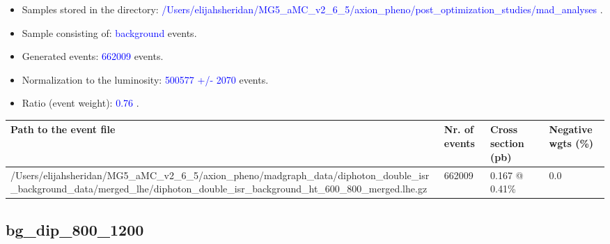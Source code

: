 \documentclass[a4paper, 10pt]{article}
\begin{document}
\begin{itemize}
  \item Samples stored in the directory: \textcolor{blue}{/\-Users/\-elijahsheridan/\-MG5\_aMC\_v2\_6\_5/\-axion\_pheno/\-post\_optimization\_studies/\-mad\_analyses} .
   \item Sample consisting of: \textcolor{blue}{background}  events.
   \item Generated events: \textcolor{blue}{662009 }  events.
   \item Normalization to the luminosity: \textcolor{blue}{500577}\textcolor{blue}{ +/\-- }\textcolor{blue}{2070 }  events.
   \item Ratio (event weight): \textcolor{blue}{0.76 } .  
 
\end{itemize}
\begin{table}[H]
  \begin{center}
    \begin{tabular}{|m{55.0mm}|m{25.0mm}|m{30.0mm}|m{30.0mm}|}
      \hline
      {\cellcolor{yellow}         Path to the event file}& {\cellcolor{yellow}         Nr. of events}& {\cellcolor{yellow}         Cross section (pb)}& {\cellcolor{yellow}         Negative wgts (\%)}\\
      \hline
      {\cellcolor{white}          /\-Users/\-elijahsheridan/\-MG5\_aMC\_v2\_6\_5/\-axion\_pheno/\-madgraph\_data/\-diphoton\_double\_isr\_background\_data/\-merged\_lhe/\-diphoton\_double\_isr\_background\_ht\_600\_800\_merged.lhe.gz}& {\cellcolor{white}          662009}& {\cellcolor{white}          0.167 @ 0.41\%}& {\cellcolor{white}          0.0}\\
\hline
    \end{tabular}
  \end{center}
\end{table}

\subsection{ bg\_dip\_800\_1200}
\end{document}
